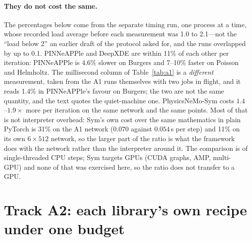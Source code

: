 \documentclass[11pt]{article}
\newcommand{\code}[1]{\protect\path{#1}\xspace}
\newcommand{\fit}[1]{\resizebox{\ifdim\width>\linewidth\linewidth\else\width\fi}{!}{#1}}
\begin{document}
\paragraph{They do not cost the same.} The percentages below come from the separate timing run, one
process at a time, whose recorded load average before each measurement was 1.0 to 2.1---not the
``load below 2'' an earlier draft of the protocol asked for, and the runs overlapped by up to 0.1.
PINNeAPPle and DeepXDE are within 11\% of each other per iteration: PINNeAPPle is 4.6\% slower on
Burgers and 7--10\% faster on Poisson and Helmholtz. The millisecond column of Table~\ref{tab:a1}
is a \emph{different} measurement, taken from the A1 runs themselves with two jobs in flight, and it
reads 1.4\% in PINNeAPPle's favour on Burgers; the two are not the same quantity, and the text
quotes the quiet-machine one. PhysicsNeMo-Sym costs $1.4$--$1.9\times$ more per iteration on the same
network and the same points. Most of that is not interpreter overhead: Sym's own cost over the same
mathematics in plain PyTorch is 31\% on the A1 network ($0.070$ against $0.054$\,s per step) and
11\% on its own $6\times512$ network, so the larger part of the ratio is what the framework does with
the network rather than the interpreter around it. The comparison is of
single-threaded CPU steps; Sym targets GPUs (CUDA graphs, AMP, multi-GPU) and none of that was
exercised here, so the ratio does not transfer to a GPU.

\section{Track A2: each library's own recipe under one budget}\label{sec:a2}

\begin{table}[t]
\centering\small
\fit{}
\caption{Track~A2, each framework's documented recipe, 3 seeds, capped at 240\,s of process CPU time
per run. Relative $L^2$, median [min, max], and the steps taken and CPU seconds used. Only the
Helmholtz column of PhysicsNeMo-Sym applies a published example; on the other three problems the
runner builds the recipe from that example's structure (and, for Burgers and Allen--Cahn, from
\code{wave_1d}), as the records' \code{config.example} field states. The two right-hand
PhysicsNeMo-Sym columns are labelled variants requested after the first A2 results---the network
matched to PINNeAPPle's, and the points per step matched---and are variants of that reconstruction,
not of a published recipe.}
\label{tab:a2}
\end{table}
\end{document}
